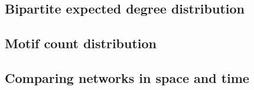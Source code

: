 \subsection*{Bipartite expected degree distribution}

\subsection{Motif count distribution}

\subsection{Comparing networks in space and time}

